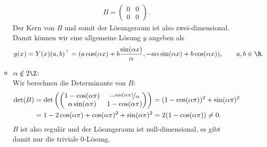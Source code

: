\begin{solution}
\begin{enumerate}[label = \textbf{\alph*)}]
\begin{itemize}
    \begin{align*}
      B = \begin{pmatrix}
        0 & 0 \\ 0 & 0
      \end{pmatrix}.
    \end{align*}
    Der Kern von $B$ und somit der Lösungsraum ist also zwei-dimensional.
    Damit können wir eine allgemeine Lösung $y$ angeben als
    \begin{align*}
      y(x) = Y(x)(a,b)^{\top} = (a\cos(\alpha x) + b\frac{\sin(\alpha x)}{\alpha}, -a\alpha\sin(\alpha x) + b\cos(\alpha x)), \qquad a,b \in \R.
    \end{align*}
    \item $\alpha \notin 2\Z$: \\
      Wir berechnen die Determinante von $B$:
      \begin{align*}
        \det(B) &= \det\left(\begin{pmatrix}
          1 - \cos(\alpha \pi) & -\nicefrac{\sin(\alpha \pi)}{\alpha} \\
          \alpha\sin(\alpha \pi) & 1 - \cos(\alpha \pi)
        \end{pmatrix}\right)
        = (1 - \cos(\alpha \pi))^2 + \sin(\alpha \pi)^2 \\
        &= 1 - 2\cos(\alpha \pi) + \cos(\alpha \pi)^2 + \sin(\alpha \pi)^2
        = 2(1 - \cos(\alpha \pi)) \neq 0.
      \end{align*}
      $B$ ist also regulär und der Lösungsraum ist null-dimensional, es gibt damit nur die triviale $0$-Lösung.
  \end{itemize}
\end{enumerate}
\end{solution}
